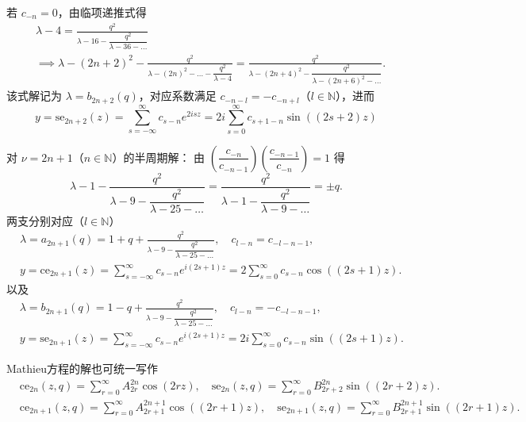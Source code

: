 若 \(c_{-n} = 0\)，由临项递推式得
\begin{align*}
	 & \lambda - 4 = \frac{q^2}{\lambda - 16 - \dfrac{q^2}{\lambda - 36 - \dots}}                                                                                                      \\
	 & \implies \lambda - (2n + 2)^2 - \frac{q^2}{\lambda - (2n)^2 - \dots - \dfrac{q^2}{\lambda - 4}} = \frac{q^2}{\lambda - (2n + 4)^2 - \dfrac{q^2}{\lambda - (2n + 6)^2 - \dots}}.
\end{align*}
该式解记为 \(\lambda = b_{2n+2}(q)\)，对应系数满足 \(c_{-n-l} = -c_{-n+l}\)（\(l \in \mathbb{N}\)），进而
\begin{equation*}
	y = \mathrm{se}_{2n+2}(z) = \sum_{s=-\infty}^{\infty} c_{s-n} e^{2isz} = 2i \sum_{s=0}^{\infty} c_{s+1-n} \sin((2s + 2)z)
\end{equation*}

对 \(\nu = 2n + 1\)（\(n \in \mathbb{N}\)）的半周期解：
由 \(\left( \dfrac{c_{-n}}{c_{-n-1}} \right) \left( \dfrac{c_{-n-1}}{c_{-n}} \right) = 1\) 得
\begin{equation*}
	\lambda - 1 - \frac{q^2}{\lambda - 9 - \dfrac{q^2}{\lambda - 25 - \dots}} = \frac{q^2}{\lambda - 1 - \dfrac{q^2}{\lambda - 9 - \dots}} = \pm q.
\end{equation*}
两支分别对应（\(l \in \mathbb{N}\)）
\begin{align*}
	 & \lambda = a_{2n+1}(q) = 1 + q + \frac{q^2}{\lambda - 9 - \dfrac{q^2}{\lambda - 25 - \dots}}, \quad c_{l-n} = c_{-l-n-1},      \\
	 & y = \mathrm{ce}_{2n+1}(z) = \sum_{s=-\infty}^{\infty} c_{s-n} e^{i(2s + 1)z} = 2 \sum_{s=0}^{\infty} c_{s-n} \cos((2s + 1)z).
\end{align*}
以及
\begin{align*}
	 & \lambda = b_{2n+1}(q) = 1 - q + \frac{q^2}{\lambda - 9 - \dfrac{q^2}{\lambda - 25 - \dots}}, \quad c_{l-n} = -c_{-l-n-1},      \\
	 & y = \mathrm{se}_{2n+1}(z) = \sum_{s=-\infty}^{\infty} c_{s-n} e^{i(2s + 1)z} = 2i \sum_{s=0}^{\infty} c_{s-n} \sin((2s + 1)z).
\end{align*}

Mathieu方程的解也可统一写作
\begin{align*}
	 & \mathrm{ce}_{2n}(z, q) = \sum_{r=0}^{\infty} A_{2r}^{2n} \cos(2rz), \quad
	\mathrm{se}_{2n}(z, q) = \sum_{r=0}^{\infty} B_{2r+2}^{2n} \sin((2r + 2)z).              \\
	 & \mathrm{ce}_{2n+1}(z, q) = \sum_{r=0}^{\infty} A_{2r+1}^{2n+1} \cos((2r + 1)z), \quad
	\mathrm{se}_{2n+1}(z, q) = \sum_{r=0}^{\infty} B_{2r+1}^{2n+1} \sin((2r + 1)z).
\end{align*}

